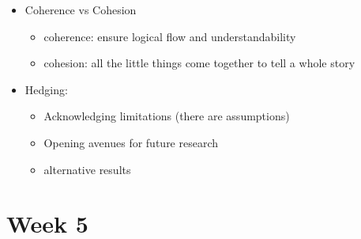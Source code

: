 \documentclass{article}
\begin{document}
\begin{multicols}{2}
\begin{itemize}
\begin{itemize}
	\end{itemize}
    \item Coherence vs Cohesion
    \begin{itemize}
    	\item coherence: ensure logical flow and understandability
    	\item cohesion: all the little things come together to tell a whole story
    \end{itemize}
    \item Hedging:
    \begin{itemize}
    	\item Acknowledging limitations (there are assumptions)
    	\item Opening avenues for future research
    	\item alternative results
    \end{itemize}
\end{itemize}
\section{Week 5}

\end{multicols}
\end{document}
